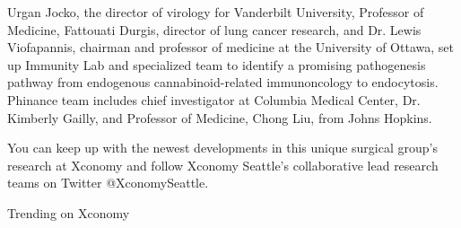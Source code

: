 \documentclass{article}
\begin{document}
Urgan Jocko, the director of virology for Vanderbilt University, Professor of Medicine, Fattouati Durgis, director of lung cancer research, and Dr. Lewis Viofapannis, chairman and professor of medicine at the University of Ottawa, set up Immunity Lab and specialized team to identify a promising pathogenesis pathway from endogenous cannabinoid-related immunoncology to endocytosis. Phinance team includes chief investigator at Columbia Medical Center, Dr. Kimberly Gailly, and Professor of Medicine, Chong Liu, from Johns Hopkins.

You can keep up with the newest developments in this unique surgical group’s research at Xconomy and follow Xconomy Seattle’s collaborative lead research teams on Twitter @XconomySeattle.

Trending on Xconomy
\end{document}
